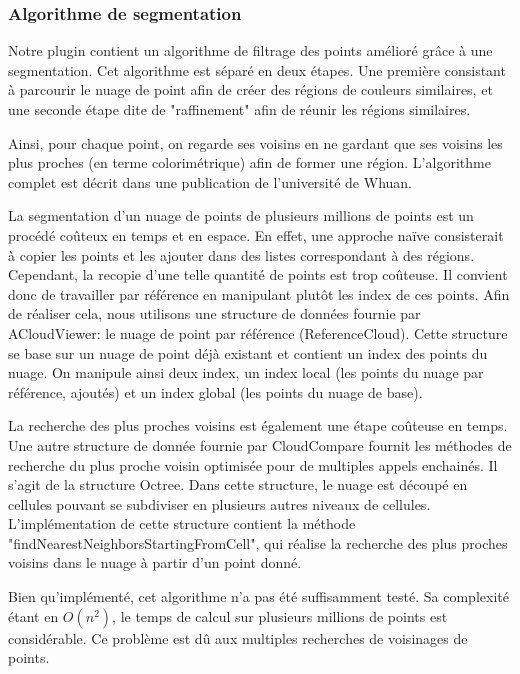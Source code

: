 \documentclass[12pt,titlepage,french]{article}
\begin{document}
\subsubsection{Algorithme de segmentation}

Notre plugin contient un algorithme de filtrage des points amélioré grâce à une segmentation. Cet algorithme est séparé en deux étapes. Une première consistant à parcourir le nuage de point afin de créer des régions de couleurs similaires, et une seconde étape dite de "raffinement" afin de réunir les régions similaires. \newline

Ainsi, pour chaque point, on regarde ses voisins en ne gardant que ses voisins les plus proches (en terme colorimétrique) afin de former une région. L'algorithme complet est décrit dans une publication de l'université de \cite{B01} Whuan. \newline

La segmentation d'un nuage de points de plusieurs millions de points est un procédé coûteux en temps et en espace. En effet, une approche naïve consisterait à copier les points et les ajouter dans des listes correspondant à des régions. Cependant, la recopie d'une telle quantité de points est trop coûteuse. Il convient donc de travailler par référence en manipulant plutôt les index de ces points.
Afin de réaliser cela, nous utilisons une structure de données fournie par ACloudViewer: le nuage de point par référence (ReferenceCloud). Cette structure se base sur un nuage de point déjà existant et contient un index des points du nuage. On manipule ainsi deux index, un index local (les points du nuage par référence, ajoutés) et un index global (les points du nuage de base). \newline

La recherche des plus proches voisins est également une étape coûteuse en temps. Une autre structure de donnée fournie par CloudCompare fournit les méthodes de recherche du plus proche voisin optimisée pour de multiples appels enchainés. Il s'agit de la structure Octree. Dans cette structure, le nuage est découpé en cellules pouvant se subdiviser en plusieurs autres niveaux de cellules. L'implémentation de cette structure contient la méthode "findNearestNeighborsStartingFromCell", qui réalise la recherche des plus proches voisins dans le nuage à partir d'un point donné. \newline

Bien qu'implémenté, cet algorithme n'a pas été suffisamment testé. Sa complexité étant en $O(n^{2})$, le temps de calcul sur plusieurs millions de points est considérable. Ce problème est dû aux multiples recherches de voisinages de points.
\end{document}
